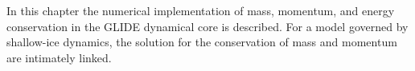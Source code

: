 
In this chapter the numerical implementation of mass, momentum, and energy conservation in the GLIDE dynamical core is described. For a model governed by shallow-ice dynamics, the solution for the conservation of mass and momentum are intimately linked.





